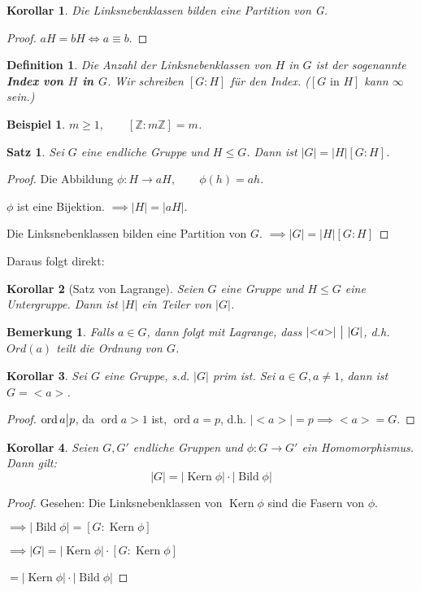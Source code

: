 \documentclass{article}
\theoremstyle{plain}
\newtheorem{definition}{Definition}
\newtheorem{theorem}{Satz}
\newtheorem{corollary}{Korollar}
\newtheorem{beispiel}{Beispiel}
\newtheorem{bemerkung}{Bemerkung}
\renewcommand{\ker}{\mathop{\text{Kern}}}
\newcommand{\bild}{\mathop{\text{Bild}}}
\newcommand{\defn}[1]{\textbf{#1}}
\newcommand{\Z}{\mathbb{Z}}
\newcommand{\ug}{\leq}
\newcommand{\ord}{\mathop{\text{ord}}}
\newcommand{\teilt}{\big{|}}
\newcommand{\zykl}[1]{{<}{#1}{>}}
\begin{document}
\begin{corollary}
    Die Linksnebenklassen bilden eine Partition von G.
\end{corollary}
\begin{proof}
    $aH=bH\Leftrightarrow a\equiv b$.    
\end{proof}

\begin{definition}
    Die Anzahl der Linksnebenklassen von $H$ in $G$ ist der sogenannte \defn{Index von $H$ in $G$}. Wir schreiben $[G:H]$ für den Index. ($[G\text{ in }H]$ kann $\infty$ sein.)
\end{definition}

\begin{beispiel}
    $m\geq 1,\qquad [\Z:m\Z]=m$.
\end{beispiel}

\begin{theorem}
    Sei $G$ eine endliche Gruppe und $H\ug G$. Dann ist $|G|=|H|[G:H]$.
\end{theorem}
\begin{proof}
    Die Abbildung $\phi\colon H\to aH, \qquad \phi(h)=ah$. 
    
    $\phi$ ist eine Bijektion. $\implies |H|=|aH|$.

    Die Linksnebenklassen bilden eine Partition von $G$. $\implies |G|=|H|[G:H]$
\end{proof}
Daraus folgt direkt:
\begin{corollary}[Satz von Lagrange]\label{stz:lagrange}
    Seien $G$ eine Gruppe und $H\ug G$ eine Untergruppe. Dann ist $|H|$ ein Teiler von $|G|$.
\end{corollary}
\begin{bemerkung}
    Falls $a\in G$, dann folgt mit Lagrange, dass $|\zykl{a}|\ \teilt\ |G|$, d.h. $Ord(a)$ teilt die Ordnung von $G$.
\end{bemerkung}
\begin{corollary}
    Sei $G$ eine Gruppe, s.d. $|G|$ prim ist. Sei $a\in G, a\neq 1$, dann ist $G=\zykl{a}$. 
\end{corollary}
\begin{proof}
    $\ord a \teilt p$, da $\ord a > 1$ ist, $\ord a =p$, d.h. $|\zykl{a}|=p \implies \zykl{a}=G.$
\end{proof}

\begin{corollary}\label{cor:ordnung}
    Seien $G, G'$ endliche Gruppen und $\phi\colon G\to G'$ ein Homomorphismus. Dann gilt:
    $$|G|=|\ker \phi|\cdot|\bild \phi|$$
\end{corollary}
\begin{proof}
    Gesehen: Die Linksnebenklassen von $\ker \phi$ sind die Fasern von $\phi$. 
    
    $\implies |\bild\phi|=[G:\ker\phi]$
    
    $\implies |G| = |\ker\phi|\cdot[G:\ker\phi]$
    
    \qquad $=|\ker\phi|\cdot|\bild\phi|$
\end{proof}
\end{document}

